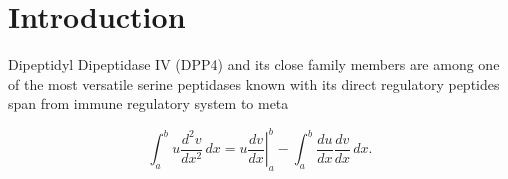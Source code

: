 \section{Introduction}
\label{intro} 

Dipeptidyl Dipeptidase IV (DPP4) and its close family members are among one of the most versatile serine peptidases known with its direct regulatory peptides span from immune regulatory system to meta

\begin{equation}
\label{eqn:drag}
	\int_a^bu\frac{d^2v}{dx^2}\,dx
	=\left.u\frac{dv}{dx}\right|_a^b
	-\int_a^b\frac{du}{dx}\frac{dv}{dx}\,dx.
\end{equation}

